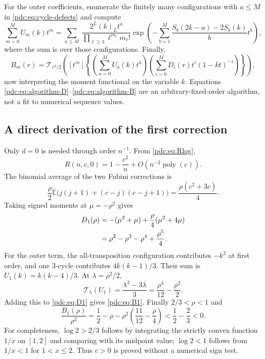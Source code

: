 \documentclass[11pt,letterpaper]{article}
\theoremstyle{remark}\newtheorem{remark}[theorem]{Remark}
\newcommand{\fall}[2]{(#1)_{#2}}
\newcommand{\E}{\mathbb E}
\begin{document}
For the outer coefficients, enumerate the finitely many configurations with $a\leq M$ in \eqref{pdc:eq:cycle-defects} and compute
\begin{equation}\label{pdc:eq:algorithm-U}
 \sum_{m=0}^M U_m(k)t^m
 =\sum_{a\leq M}\ 
 \frac{2^L\fall{k}{L}t^a}{\prod_{\ell\geq3}\ell^{m_\ell}m_\ell!}
 \exp\left(-\sum_{b=1}^M
       \frac{S_b(2k-a)-2S_b(k)}b t^b\right),
\end{equation}
where the sum is over those configurations. Finally,
\begin{equation}\label{pdc:eq:algorithm-B}
 B_m(r)=\mathcal T_{r^2/2}\!\left(
 [t^m]\left\{\left(\sum_{a=0}^M U_a(k)t^a\right)
 \left(\sum_{i=0}^M D_i(r)t^i(1-kt)^{-i}\right)\right\}\right),
\end{equation}
now interpreting the moment functional on the variable $k$. Equations \eqref{pdc:eq:algorithm-D}--\eqref{pdc:eq:algorithm-B} are an arbitrary-fixed-order algorithm, not a fit to numerical sequence values.

\subsection{A direct derivation of the first correction}
Only $d=0$ is needed through order $n^{-1}$. From \eqref{pdc:eq:Rlog},
\[
 R(n,c,0)=1-\frac{c^2}{n}+O(n^{-2}\operatorname{poly}(c)).
\]
The binomial average of the two Fubini corrections is
\[
 \frac{\rho}{2}\E\bigl(j(j+1)+(c-j)(c-j+1)\bigr)
       =\frac{\rho(c^2+3c)}4.
\]
Taking signed moments at $\mu=-\rho^2$ gives
\begin{align}
 D_1(\rho)&=-(\mu^2+\mu)+\frac\rho4(\mu^2+4\mu)\notag\\
           &=\rho^2-\rho^3-\rho^4+\frac{\rho^5}4.\label{pdc:eq:D1}
\end{align}
For the outer term, the all-transposition configuration contributes $-k^2$ at first order, and one $3$-cycle contributes $4k(k-1)/3$. Their sum is $U_1(k)=k(k-4)/3$. At $\lambda=\rho^2/2$,
\[
 \mathcal T_\lambda(U_1)=\frac{\lambda^2-3\lambda}{3}
             =\frac{\rho^4}{12}-\frac{\rho^2}{2}.
\]
Adding this to \eqref{pdc:eq:D1} gives \eqref{pdc:eq:B1}. Finally $2/3<\rho<1$ and
\[
 \frac{B_1(\rho)}{\rho^2}
   =\frac12-\rho-\rho^2\left(\frac{11}{12}-\frac\rho4\right)
   <\frac12-\frac23<0.
\]
For completeness, $\log2>2/3$ follows by integrating the strictly convex function $1/x$ on $[1,2]$ and comparing with its midpoint value; $\log2<1$ follows from $1/x<1$ for $1<x\leq2$. Thus $c>0$ is proved without a numerical sign test.
\end{document}
